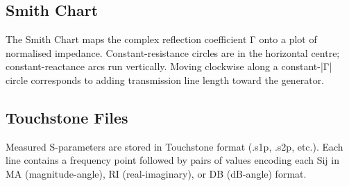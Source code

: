 				

\subsection{Smith Chart}

				


				

The Smith Chart maps the complex reflection coefficient Γ onto a plot of normalised impedance. Constant-resistance circles are in the horizontal centre; constant-reactance arcs run vertically. Moving clockwise along a constant-|Γ| circle corresponds to adding transmission line length toward the generator.

				

\subsection{Touchstone Files}

				

Measured S-parameters are stored in Touchstone format (.s1p, .s2p, etc.). Each line contains a frequency point followed by pairs of values encoding each Sij in MA (magnitude-angle), RI (real-imaginary), or DB (dB-angle) format.



